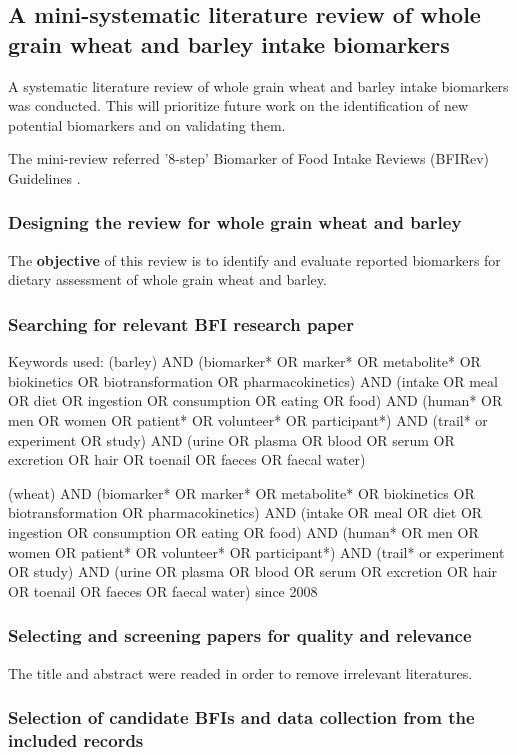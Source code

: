 \subsection{A mini-systematic literature review of whole grain wheat and barley intake biomarkers}
A systematic literature review of whole grain wheat and barley intake biomarkers was conducted. This will prioritize future work on the identification of new potential biomarkers and on validating them.

The mini-review referred '8-step' Biomarker of Food Intake Reviews (BFIRev) Guidelines \cite{Pratico2018}.

\subsubsection{Designing the review for whole grain wheat and barley}
The \textbf{objective} of this review is to identify and evaluate reported biomarkers for dietary assessment of whole grain wheat and barley.

\subsubsection{Searching for relevant BFI research paper}
Keywords used: 
(barley) AND (biomarker* OR marker* OR metabolite* OR biokinetics OR biotransformation OR pharmacokinetics) AND (intake OR meal OR diet OR ingestion OR consumption OR eating OR food) AND 
(human* OR men OR women OR patient* OR volunteer* OR participant*) AND 
(trail* or experiment OR study) AND (urine OR plasma OR blood OR serum OR excretion OR hair OR toenail OR faeces OR faecal water)

(wheat) AND (biomarker* OR marker* OR metabolite* OR biokinetics OR biotransformation OR pharmacokinetics) AND (intake OR meal OR diet OR ingestion OR consumption OR eating OR food) AND 
(human* OR men OR women OR patient* OR volunteer* OR participant*) AND 
(trail* or experiment OR study) AND (urine OR plasma OR blood OR serum OR excretion OR hair OR toenail OR faeces OR faecal water) since 2008

\subsubsection{Selecting and screening papers for quality and relevance}
The title and abstract were readed in order to remove irrelevant literatures.

\subsubsection{Selection of candidate BFIs and data collection from the included records}


